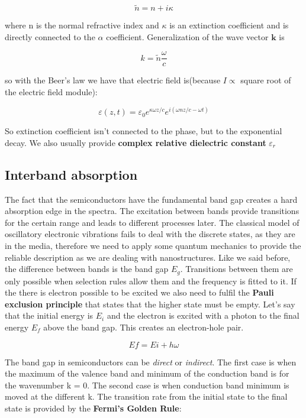 \begin{equation}
\tilde{n} = n + i\kappa
\end{equation}

where n is the normal refractive index and $\kappa$ is an extinction coefficient and is directly connected to the $\alpha$ coefficient. Generalization of the wave vector $\mathbf{k}$ is 

\begin{equation}
k = \tilde{n} \frac{\omega}{c}
\end{equation}

so with the Beer's law we have that electric field is(because $I \propto$ square root of the electric field module):

\begin{equation}
\varepsilon (z,t) = \varepsilon _0 e^{\kappa \omega z/c} e^{i(\omega nz/c - \omega t)}
\end{equation}

So extinction coefficient isn't connected to the phase, but to the exponential decay. We also usually provide \textbf{complex relative dielectric constant} $\varepsilon _r$

\subsection{Interband absorption}
The fact that the semiconductors have the fundamental band gap creates a hard absorption edge in the spectra. The excitation between bands provide transitions for the certain range and leads to different processes later. The classical model of oscillatory electronic vibrations fails to deal with the discrete states, as they are in the media, therefore we need to apply some quantum mechanics to provide the reliable description as we are dealing with nanostructures. Like we said before, the difference between bands is the band gap $E_g$. Transitions between them are only possible when selection rules allow them and the frequency is fitted to it. If the there is electron possible to be excited we also need to fulfil the \textbf{Pauli exclusion principle} that states that the higher state must be empty. Let's say that the initial energy is $E_i$ and the electron is excited with a photon to the final energy $E_f$ above the band gap. This creates an electron-hole pair. 

\begin{equation}
Ef=Ei + h\omega
\end{equation} 

The band gap in semiconductors can be \textit{direct} or \textit{indirect}. The first case is when the maximum of the valence band and minimum of the conduction band is for the wavenumber k = 0. The second case is when conduction band minimum is moved at the different k. The transition rate from the initial state to the final state is provided by the \textbf{Fermi's Golden Rule}:


